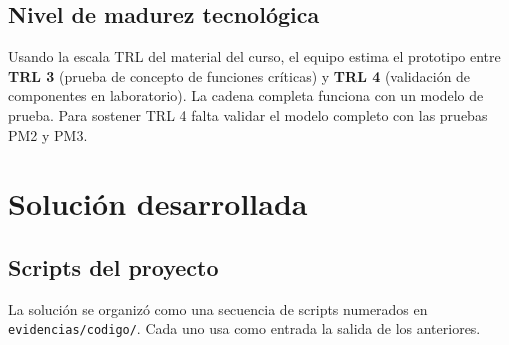 \documentclass[11.5pt]{article}
\begin{document}
\subsection{Nivel de madurez tecnológica}

Usando la escala TRL del material del curso, el equipo estima el prototipo entre \textbf{TRL 3} (prueba de concepto de funciones críticas) y \textbf{TRL 4} (validación de componentes en laboratorio). La cadena completa funciona con un modelo de prueba. Para sostener TRL 4 falta validar el modelo completo con las pruebas PM2 y PM3.

\section{Solución desarrollada}

\subsection{Scripts del proyecto}

La solución se organizó como una secuencia de scripts numerados en \texttt{evidencias/codigo/}. Cada uno usa como entrada la salida de los anteriores.
\end{document}
